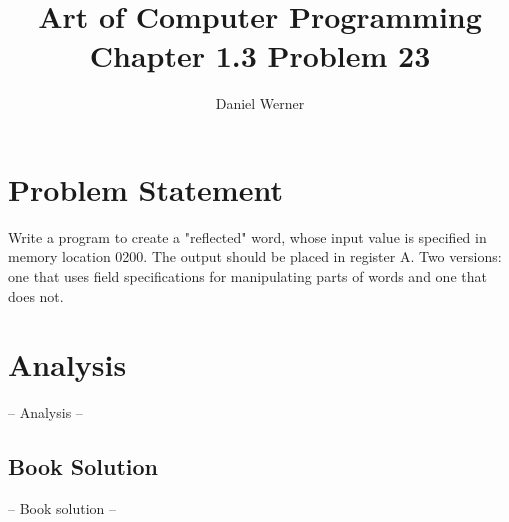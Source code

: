 \documentclass{article}
\title{Art of Computer Programming Chapter 1.3 Problem 23}
\author{Daniel Werner}
\begin{document}
\maketitle

\section*{
    Problem Statement
}

Write a program to create a "reflected" word, whose input value is specified in memory location 0200.
The output should be placed in register A.  Two versions: one that uses field specifications for manipulating
parts of words and one that does not.

\section*{
    Analysis
}

-- Analysis --

\subsection* {
  Book Solution
}

-- Book solution --
\end{document}
